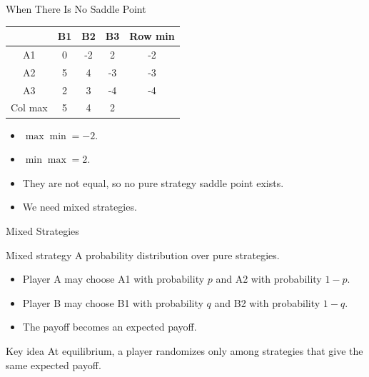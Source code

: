 \documentclass[10pt,aspectratio=169]{beamer}
\begin{document}
\begin{frame}{When There Is No Saddle Point}
\begin{center}
\begin{tabular}{c c c c c}
 & B1 & B2 & B3 & Row min\\
\midrule
A1 & 0 & -2 & 2 & -2\\
A2 & 5 & 4 & -3 & -3\\
A3 & 2 & 3 & -4 & -4\\
\midrule
Col max & 5 & 4 & 2 & \\
\end{tabular}
\end{center}
\vspace{0.2cm}
\begin{itemize}
  \item $\max \min = -2$.
  \item $\min \max = 2$.
  \item They are not equal, so no pure strategy saddle point exists.
  \item We need mixed strategies.
\end{itemize}
\end{frame}

\begin{frame}{Mixed Strategies}
\begin{block}{Mixed strategy}
A probability distribution over pure strategies.
\end{block}
\vspace{0.2cm}
\begin{itemize}
  \item Player A may choose A1 with probability $p$ and A2 with probability $1-p$.
  \item Player B may choose B1 with probability $q$ and B2 with probability $1-q$.
  \item The payoff becomes an expected payoff.
\end{itemize}
\vspace{0.2cm}
\begin{block}{Key idea}
At equilibrium, a player randomizes only among strategies that give the same expected payoff.
\end{block}
\end{frame}
\end{document}
